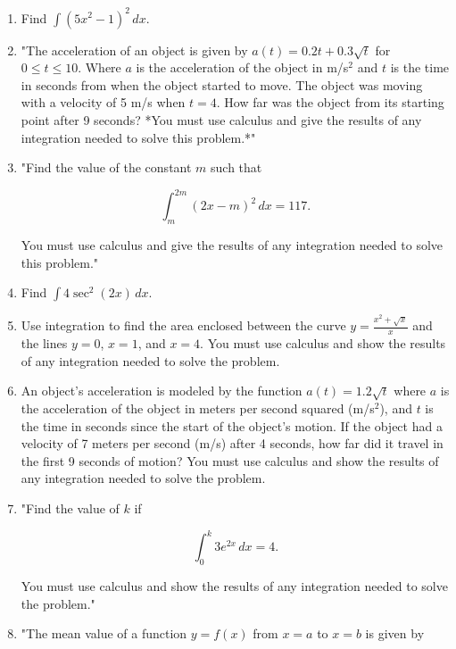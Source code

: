\documentclass{article}
\begin{document}
\begin{enumerate}
\vspace{3cm}
\item Find \( \int (5x^2 - 1)^2 \, dx \).
\vspace{3cm}
\item "The acceleration of an object is given by \( a(t) = 0.2t + 0.3\sqrt{t} \) for \( 0 \leq t \leq 10 \). Where \( a \) is the acceleration of the object in m/s\(^2\) and \( t \) is the time in seconds from when the object started to move. The object was moving with a velocity of 5 m/s when \( t = 4 \). How far was the object from its starting point after 9 seconds? *You must use calculus and give the results of any integration needed to solve this problem.*"
\vspace{3cm}
\item "Find the value of the constant \( m \) such that

\[
\int_{m}^{2m} (2x - m)^2 \, dx = 117.
\]

You must use calculus and give the results of any integration needed to solve this problem."
\vspace{3cm}
\item Find \(\int 4 \sec^2(2x) \, dx\).
\vspace{3cm}
\item Use integration to find the area enclosed between the curve \( y = \frac{x^2 + \sqrt{x}}{x} \) and the lines \( y = 0 \), \( x = 1 \), and \( x = 4 \). You must use calculus and show the results of any integration needed to solve the problem.
\vspace{3cm}
\item An object's acceleration is modeled by the function \( a(t) = 1.2\sqrt{t} \) where \( a \) is the acceleration of the object in meters per second squared (m/s\(^2\)), and \( t \) is the time in seconds since the start of the object's motion. If the object had a velocity of 7 meters per second (m/s) after 4 seconds, how far did it travel in the first 9 seconds of motion? You must use calculus and show the results of any integration needed to solve the problem.
\vspace{3cm}
\item "Find the value of \( k \) if

\[ \int_{0}^{k} 3e^{2x} \, dx = 4. \]

You must use calculus and show the results of any integration needed to solve the problem."
\vspace{3cm}
\item "The mean value of a function \( y = f(x) \) from \( x = a \) to \( x = b \) is given by


\end{enumerate}
\end{document}

